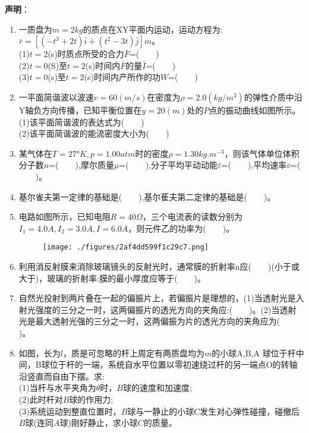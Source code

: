 
\textbf{声明}：

\begin{enumerate}
\item 一质盘为$m=2kg$的质点在XY平面内运动，运动方程为:$\bar r =[(-t^3+2t)\bar i+(t^2-3t)\bar j]m$。\\
(1)$t=2$(s)时质点所受的合力$\bar F$=($\qquad$)\\
(2)$t=0$(S)至$t=2$(s)时间内$\bar F$的量$\bar I$=($\qquad$)\\
(3)$t=0$(s)至$t=2$(s)时间内产所作的功$W$=($\qquad$)
\item 一平面简谐波以波速$v=60(m/s)$在密度为$\rho=2.0(kg/m^3)$的弹性介质中沿Y轴负方向传播，已知平衡位置在$y=20(m)$处的$P$点的振动曲线如图所示。\\
(1)该平面简谐波的表达式为($\qquad$)\\
(2)该平面简谐波的能流密度大小为($\qquad$)
\item 某气体在$T=27$°$K,p=1.00atm$时的密度$\rho=1.30kg.m^{-3}$，则该气体单位体积分子数$n$=($\qquad$),摩尔质量$\mu$=($\qquad$),分子平均平动动能$\bar \varepsilon$=($\qquad$),平均速率$\bar v$=($\qquad$)。
\item 基尔雀夫第一定律的基础是($\qquad$),基尔萑夫第二定律的基础是($\qquad$)。
\item 电路如图所示，已知电阻$R=40\Omega$，三个电流表的读数分别为$I_1=4.0A,I_2=3.0A,I=6.0A$，则元件乙的功率为($\qquad$)。
\begin{figure}[ht]
\centering
\texttt{[image: ./figures/2af4dd599f1c29c7.png]}
\caption{} \label{fig_SD02_1}
\end{figure}
\item 利用消反射膜来消除玻璃镜头的反射光时，通常膜的折射率n应($\qquad$)(小于或大于)，玻璃的折射率:膜的最小厚度应等于($\qquad$)。
\item 自然光投射到两片叠在一起的偏振片上，若偏振片是理想的，(1)当透射光是入射光强度的三分之一时，这两偏振片的透光方向的夹角应:($\qquad$)。(2)当透射光是最大透射光强的三分之一时，这两偏振为片的透光方向的夹角应为($\qquad$)。
\item 如图，长为$l$，质是可忽略的杆上周定有两质盘均为$m$的小球A,B,A 球位于杆中间，B球位于杆的一端，系统自水平位置以零初速绕过杆的另一端点O的转轴沿竖直而自由下摆。求:\\
(1)当杆与水平夹角为$\theta$时，$B$球的速度和加速度;\\
(2)此时杆对$B$球的作用力;\\
(3)系统运动到整直位置时，$B$球与一静止的小球$C$发生对心弹性碰撞，碰撤后$B$球(连同$A$球)刚好静止，求小球$C$的质量。
\end{enumerate}
